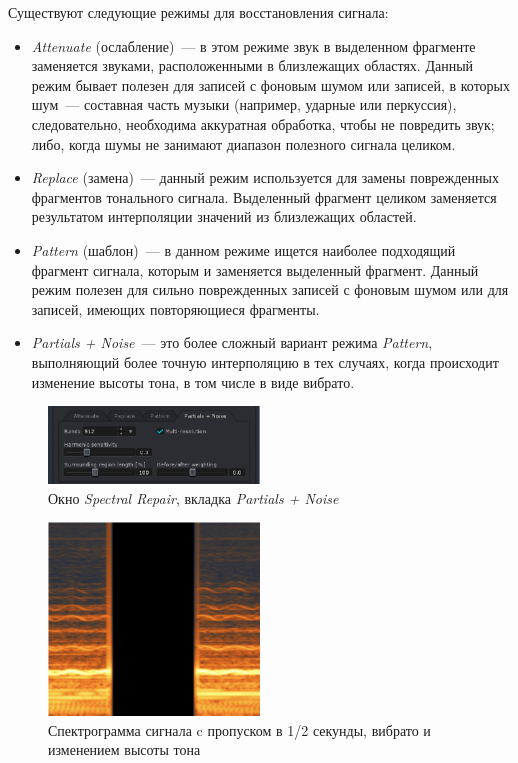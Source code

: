 \documentclass[oneside, final, 14pt]{extreport}
\begin{document}
Существуют следующие режимы для восстановления сигнала:
\begin{itemize}
  \item \emph{Attenuate} (ослабление)~--- в этом режиме звук в выделенном фрагменте заменяется звуками, расположенными в близлежащих областях. Данный режим бывает полезен для записей с фоновым шумом или записей, в которых шум~--- составная часть музыки (например, ударные или перкуссия), следовательно, необходима аккуратная обработка, чтобы не повредить звук; либо, когда шумы не занимают диапазон полезного сигнала целиком.
  \item \emph{Replace} (замена)~--- данный режим используется для замены поврежденных фрагментов тонального сигнала. Выделенный фрагмент целиком заменяется результатом интерполяции значений из близлежащих областей.
  \item \emph{Pattern} (шаблон)~--- в данном режиме ищется наиболее подходящий фрагмент сигнала, которым и заменяется выделенный фрагмент. Данный режим полезен для сильно поврежденных записей с фоновым шумом или для записей, имеющих повторяющиеся фрагменты.
  \item \emph{Partials + Noise}~--- это более сложный вариант режима \emph{Pattern}, выполняющий более точную интерполяцию в тех случаях, когда происходит изменение высоты тона, в том числе в виде вибрато.
\end{itemize}

\begin{figure}[h]
  \centering
  \includegraphics[width=0.5\textwidth]{pic-repair-01}
  \caption{Окно \emph{Spectral Repair}, вкладка \emph{Partials + Noise}}
  \label{pic-repair-01}
\end{figure}

\begin{figure}[h]
  \centering
  \includegraphics[width=0.5\textwidth]{pic-repair-02}
  \caption{Спектрограмма сигнала c пропуском в 1/2 секунды, вибрато и изменением высоты тона}
  \label{pic-repair-02}
\end{figure}
\end{document}
